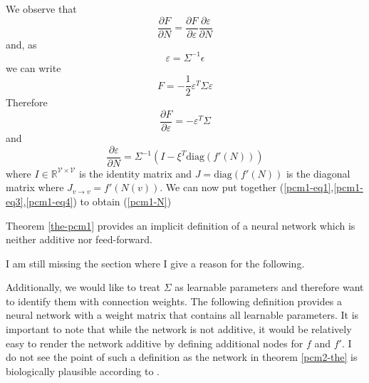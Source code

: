 \documentclass[a4paper,11pt]{article}
\begin{document}
\begin{Bew}
We observe that
\begin{equation}\label{pcm1-eq1}
\frac{\partial F}{\partial N}=\frac{\partial F}{\partial\varepsilon}\frac{\partial\varepsilon}{\partial N}
\end{equation}
and, as
\[\varepsilon=\Sigma^{-1}\epsilon\]
we can write
\begin{equation}\label{pcm1-eq2}
F=-\frac12\varepsilon^T\Sigma\varepsilon
\end{equation}
Therefore
\begin{equation}\label{pcm1-eq3}
\frac{\partial F}{\partial\varepsilon}=-\varepsilon^T\Sigma
\end{equation}
and
\begin{equation}\label{pcm1-eq4}
\frac{\partial\varepsilon}{\partial N}=\Sigma^{-1}\left(I-\xi^T\text{diag}(f'(N))\right)
\end{equation}
where $I\in\mathbb{R}^{\mathcal{V}\times\mathcal{V}}$ is the identity matrix and $J=\text{diag}(f'(N))$ is the diagonal matrix where $J_{v\to v}=f'(N(v))$. We can now put together (\ref{pcm1-eq1},\ref{pcm1-eq3},\ref{pcm1-eq4}) to obtain (\ref{pcm1-N})
\end{Bew}
\begin{Abs}
Theorem \ref{the-pcm1} provides an implicit definition of a neural network which is neither additive nor feed-forward.
\begin{OP}
I am still missing the section where I give a reason for the following.
\end{OP}
Additionally, we would like to treat $\Sigma$ as learnable parameters and therefore want to identify them with connection weights. The following definition provides a neural network with a weight matrix that contains all learnable parameters. It is important to note that while the network is not additive, it would be relatively easy to render the network additive by defining additional nodes for $f$ and $f'$. I do not see the point of such a definition as the network in theorem \ref{pcm2-the} is biologically plausible according to \cite{Whittington2017}.
\end{Abs}
\end{document}
